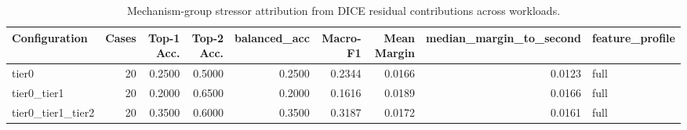 \begin{table}[t]
\centering
\caption{Mechanism-group stressor attribution from DICE residual contributions across workloads.}
\label{tab:dice_stressor_diagnosis}
\footnotesize
\begin{tabular}{lrrrrrrrl}
\toprule
Configuration & Cases & Top-1 Acc. & Top-2 Acc. & balanced_acc & Macro-F1 & Mean Margin & median_margin_to_second & feature_profile \\
\midrule
tier0 & 20 & 0.2500 & 0.5000 & 0.2500 & 0.2344 & 0.0166 & 0.0123 & full \\
tier0_tier1 & 20 & 0.2000 & 0.6500 & 0.2000 & 0.1616 & 0.0189 & 0.0166 & full \\
tier0_tier1_tier2 & 20 & 0.3500 & 0.6000 & 0.3500 & 0.3187 & 0.0172 & 0.0161 & full \\
\bottomrule
\end{tabular}

\end{table}
